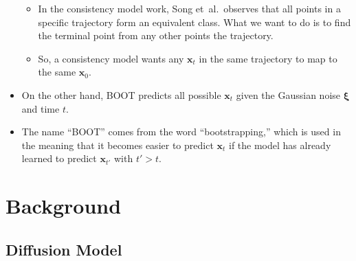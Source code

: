 \documentclass[10pt]{article}
\newcommand{\ve}[1]{\mathbf{#1}}
\newcommand{\ves}[1]{\boldsymbol{#1}}
\newcommand{\etal}{{et~al.}}
\begin{document}
\begin{itemize}
\begin{itemize}
    \item In the consistency model work, Song \etal\ observes that all points in a specific trajectory form an equivalent class. What we want to do is to find the terminal point from any other points the trajectory.    
    
    \item So, a consistency model wants any $\ve{x}_t$ in the same trajectory to map to the same $\ve{x}_0$.
  \end{itemize}

  \item On the other hand, BOOT predicts all possible $\ve{x}_t$ given the Gaussian noise $\ves{\xi}$ and time $t$.
  
  \item The name ``BOOT'' comes from the word ``bootstrapping,'' which is used in the meaning that it becomes easier to predict $\ve{x}_t$ if the model has already learned to predict $\ve{x}_{t'}$ with $t' > t$.
\end{itemize}

\section{Background}

\subsection{Diffusion Model}
\end{document}
